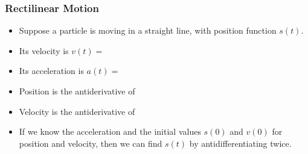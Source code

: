 \begin{frame}
\frametitle{Rectilinear Motion}
\begin{itemize}
\item  Suppose a particle is moving in a straight line, with position function $s(t)$.
\item<2->  Its velocity is \alert<handout:0| 2-3,7>{$v(t) =$ }
\item<4->  Its acceleration is \alert<handout:0| 4-5,9>{$a(t) =$ }
\item<6-| alert@6-7>  Position is the antiderivative of 
\item<6-| alert@8-9>  Velocity is the antiderivative of 
\item<10->  If we know the acceleration and the initial values $s(0)$ and $v(0)$ for position and velocity, then we can find $s(t)$ by antidifferentiating twice.
\end{itemize}
\end{frame}

